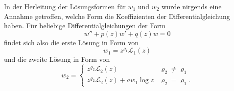 In der Herleitung der Lösungsformen für $w_1$ und $w_2$ wurde nirgends eine Annahme getroffen, welche Form die Koeffizienten der Differentialgleichung haben. Für beliebige Differentialgleichungen der Form
$$w'' + p(z)w' + q(z)w=0$$
findet sich also die erste Lösung in Form von
$$ w_1 = z^{\varrho_1}\mathcal{L}_1(z)$$
und die zweite Lösung in Form von
$$w_2 = \begin{cases}
z^{\varrho_2}\mathcal{L}_2(z) & \varrho_2\ne\varrho_1 \\
z^{\varrho_2}\mathcal{L}_2(z) + a w_1 \log z & \varrho_2=\varrho_1.
\end{cases} $$
